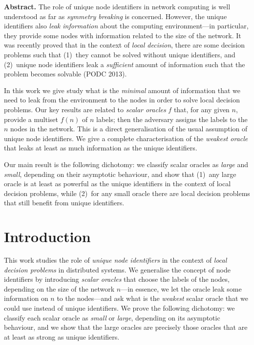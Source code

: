 \documentclass[11pt,a4paper]{article}
\theoremstyle{definition}
\theoremstyle{remark}
\newenvironment{myabstract}
               {\list{}{\listparindent 1.5em\itemindent    \listparindent
                        \leftmargin    0pt
                        \rightmargin   0pt
                        \parsep        0pt}\item\relax}
               {\endlist}
\begin{document}
\bigskip
\begin{myabstract}
\noindent\textbf{Abstract.}
The role of unique node identifiers in network computing is well understood as far as \emph{symmetry breaking} is concerned. However, the unique identifiers also \emph{leak information} about the computing environment---in particular, they provide some nodes with information related to the size of the network. It was recently proved that in the context of \emph{local decision}, there are some decision problems such that (1)~they cannot be solved without unique identifiers, and (2)~unique node identifiers leak a \emph{sufficient} amount of information such that the problem becomes solvable (PODC 2013).

In this work we give study what is the \emph{minimal} amount of information that we need to leak from the environment to the nodes in order to solve local decision problems. Our key results are related to \emph{scalar oracles} $f$ that, for any given $n$, provide a multiset $f(n)$ of $n$ labels; then the adversary assigns the labels to the $n$ nodes in the network. This is a direct generalisation of the usual assumption of unique node identifiers. We give a complete characterisation of the \emph{weakest oracle} that leaks at least as much information as the unique identifiers.

Our main result is the following dichotomy: we classify scalar oracles as \emph{large} and \emph{small}, depending on their asymptotic behaviour, and show that (1)~any large oracle is at least as powerful as the unique identifiers in the context of local decision problems, while (2)~for any small oracle there are local decision problems that still benefit from unique identifiers.
\end{myabstract}

\thispagestyle{empty}
\setcounter{page}{0}
\newpage

\section{Introduction}

This work studies the role of \emph{unique node identifiers} in the context of \emph{local decision problems} in distributed systems. We generalise the concept of node identifiers by introducing \emph{scalar oracles} that choose the labels of the nodes, depending on the size of the network $n$---in essence, we let the oracle leak some information on $n$ to the nodes---and ask what is the \emph{weakest} scalar oracle that we could use instead of unique identifiers. We prove the following dichotomy: we classify each scalar oracle as \emph{small} or \emph{large}, depending on its asymptotic behaviour, and we show that the large oracles are precisely those oracles that are at least as strong as unique identifiers.
\end{document}
